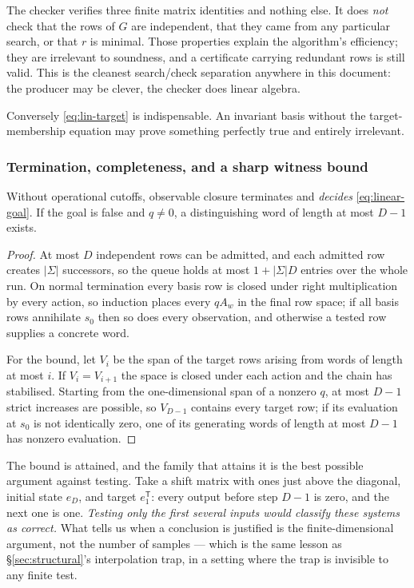 The checker verifies three finite matrix identities and nothing else. It does
\emph{not} check that the rows of $G$ are independent, that they came from any
particular search, or that $r$ is minimal. Those properties explain the
algorithm's efficiency; they are irrelevant to soundness, and a certificate
carrying redundant rows is still valid. This is the cleanest search/check
separation anywhere in this document: the producer may be clever, the checker
does linear algebra.

Conversely \eqref{eq:lin-target} is indispensable. An invariant basis without
the target-membership equation may prove something perfectly true and entirely
irrelevant.

\subsubsection*{Termination, completeness, and a sharp witness bound}

\begin{theorem}
\label{thm:linear-complete}
Without operational cutoffs, observable closure terminates and \emph{decides}
\eqref{eq:linear-goal}. If the goal is false and $q\ne0$, a distinguishing word
of length at most $D-1$ exists.
\end{theorem}
\begin{proof}
At most $D$ independent rows can be admitted, and each admitted row creates
$|\Sigma|$ successors, so the queue holds at most $1+|\Sigma|D$ entries over the
whole run. On normal termination every basis row is closed under right
multiplication by every action, so induction places every $qA_w$ in the final
row space; if all basis rows annihilate $s_0$ then so does every observation,
and otherwise a tested row supplies a concrete word.

For the bound, let $V_i$ be the span of the target rows arising from words of
length at most $i$. If $V_i=V_{i+1}$ the space is closed under each action and
the chain has stabilised. Starting from the one-dimensional span of a nonzero
$q$, at most $D-1$ strict increases are possible, so $V_{D-1}$ contains every
target row; if its evaluation at $s_0$ is not identically zero, one of its
generating words of length at most $D-1$ has nonzero evaluation.
\end{proof}

The bound is attained, and the family that attains it is the best possible
argument against testing. Take a shift matrix with ones just above the
diagonal, initial state $e_D$, and target $e_1^{\mathsf T}$: every output before
step $D-1$ is zero, and the next one is one. \emph{Testing only the first
several inputs would classify these systems as correct.} What tells us when a
conclusion is justified is the finite-dimensional argument, not the number of
samples --- which is the same lesson as \S\ref{sec:structural}'s interpolation
trap, in a setting where the trap is invisible to any finite test.

